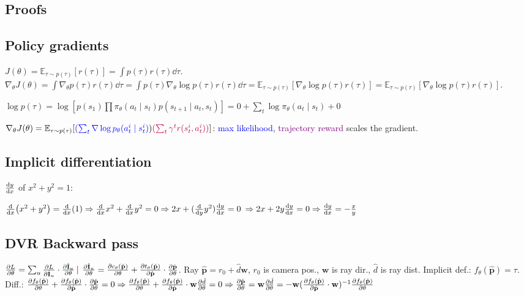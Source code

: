 \documentclass[11pt,landscape,a4paper,fleqn]{article}
\newcommand{\E}{\mathbb{E}}
\newcommand{\sep}{\,\textcolor{red}{\bm|}\,}
\def\myvector#1{\mathbf{#1}}
\def\vp{{\myvector{p}}}
\def\vw{{\myvector{w}}}
\def\mymatrix#1{\mathbf{#1}}
\def\mI{{\mymatrix{I}}}
\begin{document}
\begin{multicols*}{3}

\section{Proofs}

\subsection*{Policy gradients}
\quad$J(\theta) = \E_{\tau \sim p(\tau)} [r(\tau)]
= \int p(\tau) r(\tau) \dd \tau$.
$\nabla_\theta J(\theta) = \int \nabla_\theta p(\tau) r(\tau) \dd \tau
= \int p(\tau) \nabla_\theta \log p(\tau) r(\tau) \dd \tau
= \E_{\tau \sim p(\tau)} [\nabla_\theta \log p(\tau) r(\tau)] = \E_{\tau \sim p(\tau)}[\nabla_\theta \log p(\tau) r(\tau)]$.

$\log p(\tau) = \log[p(s_1)\prod \pi_\theta(a_t \mid s_t) p(s_{t+1} \mid a_t, s_t)]
= 0 + \sum_t \log \pi_\theta(a_t \mid s_t) + 0$

$\nabla_\theta J(\theta) = \E_{\tau \sim p(\tau)}
[\textcolor{blue}{(\sum_t \nabla \log p_\theta(a_t^i \mid s_t^i)})\textcolor{purple}{(\sum_t \gamma^t r(s_t^i, a_t^i))}]$:
\textcolor{blue}{max likelihood}, \textcolor{purple}{trajectory reward} scales the gradient.

\subsection*{Implicit differentiation}

$\dv{y}{x}$ of $x^2 + y^2 = 1$:

$\dv{x}(x^2 + y^2) = \dv{x}(1) \Rightarrow \dv{x}x^2 + \dv{x}y^2 = 0 \Rightarrow 2x + (\dv{y} y^2) \dv{y}{x} = 0$
$\Rightarrow 2x + 2y \dv{y}{x} = 0 \Rightarrow \dv{y}{x} =- \frac{x}{y}$

\subsection*{DVR Backward pass}
$\pdv{L}{\theta} = \sum_u \pdv{L}{\hat\mI_u} \cdot \pdv{\hat\mI_u}{\theta} \sep\!$
$\pdv{\hat\mI_u}{\theta} = \pdv{c_\theta(\hat\vp)}{\theta} + \pdv{t_\theta(\hat\vp)}{\hat\vp}
 \cdot \pdv{\hat\vp}{\theta}$.
Ray $\hat\vp = r_0 + \hat{d}\vw$,
$r_0$ is camera pos., $\vw$ is ray dir., $\hat{d}$ is ray dist.
Implicit def.: $f_\theta(\hat\vp) = \tau$.
Diff.:
$\pdv{f_\theta(\hat\vp)}{\theta} + \pdv{f_\theta(\hat\vp)}{\hat\vp} \cdot \pdv{\hat\vp}{\theta} = 0 \Rightarrow
\pdv{f_\theta(\hat\vp)}{\theta} + \pdv{f_\theta(\hat\vp)}{\hat\vp} \cdot \vw\pdv{\hat{d}}{\theta} = 0 \Rightarrow 
\pdv{\hat\vp}{\theta} = \vw \pdv{\hat{d}}{\theta} = - \vw(\pdv{f_\theta(\hat{\vp})}{\hat{\vp}} \cdot \vw)^{-1}
\pdv{f_\theta(\hat\vp)}{\theta}$


\end{multicols*}
\end{document}
